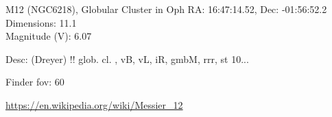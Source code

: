 \begin{block}{M12 (NGC6218), Globular Cluster in Oph}
    RA: 16:47:14.52, Dec: -01:56:52.2 \\ 
    Dimensions: 11.1 \\ 
    Magnitude (V): 6.07


    Desc: (Dreyer) !! glob. cl. , vB, vL, iR, gmbM, rrr, st 10... 

    Finder fov: 60 

    \url{https://en.wikipedia.org/wiki/Messier_12} 
\end{block}